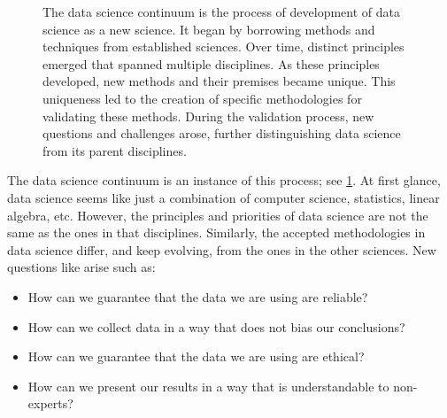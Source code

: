 \begin{figure}
  \centering
  \caption{
    The data science continuum is the process of development of data science as a new
    science.  It began by borrowing methods and techniques from established sciences. Over
    time, distinct principles emerged that spanned multiple disciplines. As these
    principles developed, new methods and their premises became unique. This uniqueness
    led to the creation of specific methodologies for validating these methods. During the
    validation process, new questions and challenges arose, further distinguishing data
    science from its parent disciplines.
  }
  \label{fig:continuum}
\end{figure}

The data science continuum is an instance of this process; see \cref{fig:continuum}.  At
first glance, data science seems like just a combination of computer science, statistics,
linear algebra, etc. However, the principles and priorities of data science are not the
same as the ones in that disciplines.  Similarly, the accepted methodologies in data
science differ, and keep evolving, from the ones in the other sciences.  New questions
like arise such as:
\begin{itemize}
  \itemsep0em
  \item How can we guarantee that the data we are using are reliable?
  \item How can we collect data in a way that does not bias our conclusions?
  \item How can we guarantee that the data we are using are ethical?
  \item How can we present our results in a way that is understandable to non-experts?
\end{itemize}

